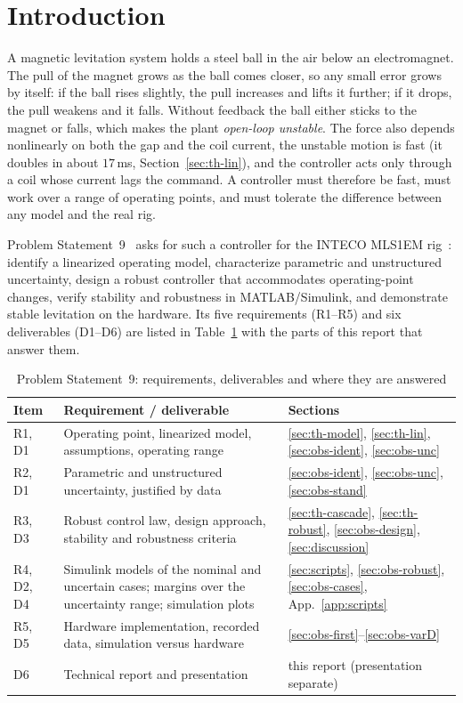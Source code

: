 \documentclass[11pt,a4paper]{article}
\begin{document}
\section{Introduction}
\label{sec:intro}
A magnetic levitation system holds a steel ball in the air below an electromagnet. The pull of the magnet grows as
the ball comes closer, so any small error grows by itself: if the ball rises slightly, the pull increases and lifts
it further; if it drops, the pull weakens and it falls. Without feedback the ball either sticks to the magnet or
falls, which makes the plant \emph{open-loop unstable}. The force also depends nonlinearly on both the gap and the
coil current, the unstable motion is fast (it doubles in about $17$\,ms, Section~\ref{sec:th-lin}), and the
controller acts only through a coil whose current lags the command. A controller must therefore be fast, must work
over a range of operating points, and must tolerate the difference between any model and the real rig.

Problem Statement~9~\cite{ps9} asks for such a controller for the INTECO MLS1EM rig~\cite{mlsmanual}: identify a
linearized operating model, characterize parametric and unstructured uncertainty, design a robust controller that
accommodates operating-point changes, verify stability and robustness in MATLAB/Simulink, and demonstrate stable
levitation on the hardware. Its five requirements (R1--R5) and six deliverables (D1--D6) are listed in
Table~\ref{tab:deliverables} with the parts of this report that answer them.

\begin{table}[H]
\centering
\caption[Requirements and deliverables of Problem Statement~9]{Problem Statement~9: requirements, deliverables and where they are answered}
\label{tab:deliverables}
\begin{tabularx}{\linewidth}{@{}l>{\raggedright\arraybackslash}X>{\raggedright\arraybackslash}p{3.6cm}@{}}
\toprule
Item & Requirement / deliverable & Sections \\
\midrule
R1, D1 & Operating point, linearized model, assumptions, operating range & \ref{sec:th-model}, \ref{sec:th-lin}, \ref{sec:obs-ident}, \ref{sec:obs-unc} \\
R2, D1 & Parametric and unstructured uncertainty, justified by data & \ref{sec:obs-ident}, \ref{sec:obs-unc}, \ref{sec:obs-stand} \\
R3, D3 & Robust control law, design approach, stability and robustness criteria & \ref{sec:th-cascade}, \ref{sec:th-robust}, \ref{sec:obs-design}, \ref{sec:discussion} \\
R4, D2, D4 & Simulink models of the nominal and uncertain cases; margins over the uncertainty range; simulation plots & \ref{sec:scripts}, \ref{sec:obs-robust}, \ref{sec:obs-cases}, App.~\ref{app:scripts} \\
R5, D5 & Hardware implementation, recorded data, simulation versus hardware & \ref{sec:obs-first}--\ref{sec:obs-varD} \\
D6 & Technical report and presentation & this report (presentation separate) \\
\bottomrule
\end{tabularx}
\end{table}
\end{document}
